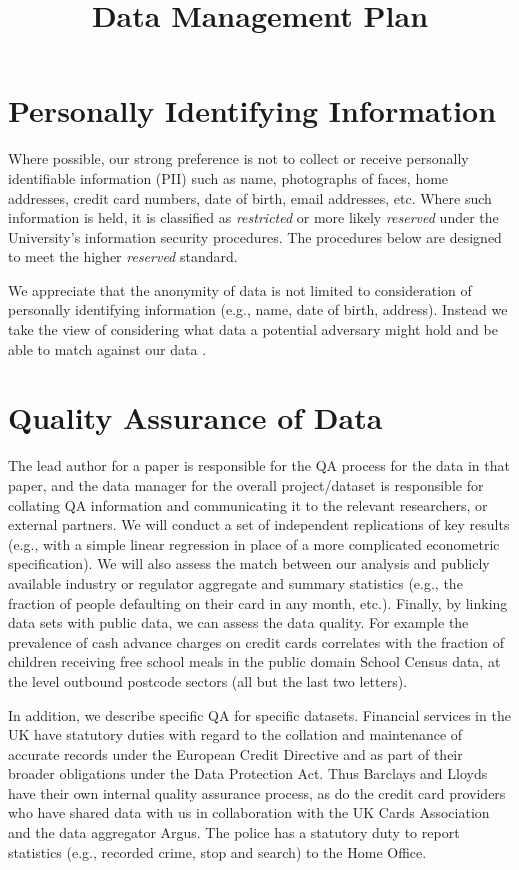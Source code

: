 \documentclass[doc]{apa6}
\title{Data Management Plan}
\begin{document}
\maketitle

\section{Personally Identifying Information}

Where possible, our strong preference is not to collect or receive personally identifiable information (PII) such as name, photographs of faces, home addresses, credit card numbers, date of birth, email addresses, etc. Where such information is held, it is classified as \emph{restricted} or more likely \emph{reserved} under the University's information security procedures. The procedures below are designed to meet the higher \emph{reserved} standard.

We appreciate that the anonymity of data is not limited to consideration of personally identifying information (e.g., name, date of birth, address). Instead we take the view of considering what data a potential adversary might hold and be able to match against our data \cite{LeaseHullmanBighamBernsteinKimLaseckiBakhshiMitraMiller13,deMontjoyeRadaelliSinghPentland15}.

\section{Quality Assurance of Data}

The lead author for a paper is responsible for the QA process for the data in that paper, and the data manager for the overall project/dataset is responsible for collating QA information and communicating it to the relevant researchers, or external partners. We will conduct a set of independent replications of key results (e.g., with a simple linear regression in place of a more complicated econometric specification). We will also assess the match between our analysis and publicly available industry or regulator aggregate and summary statistics (e.g., the fraction of people defaulting on their card in any month, etc.). Finally, by linking data sets with public data, we can assess the data quality. For example the prevalence of cash advance charges on credit cards correlates with the fraction of children receiving free school meals in the public domain School Census data, at the level outbound postcode sectors (all but the last two letters). 

In addition, we describe specific QA for specific datasets. Financial services in the UK have statutory duties with regard to the collation and maintenance of accurate records under the European Credit Directive and as part of their broader obligations under the Data Protection Act. Thus Barclays and Lloyds have their own internal quality assurance process, as do the credit card providers who have shared data with us in collaboration with the UK Cards Association and the data aggregator Argus. The police has a statutory duty to report statistics (e.g., recorded crime, stop and search) to the Home Office.
\end{document}
